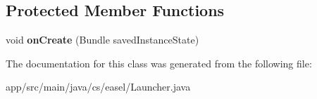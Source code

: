 \subsection*{Protected Member Functions}
\begin{DoxyCompactItemize}
\item 
\hypertarget{classcs_1_1easel_1_1_launcher_a2f03cb72c4c991de9d8530f4c359f625}{void {\bfseries on\+Create} (Bundle saved\+Instance\+State)}\label{classcs_1_1easel_1_1_launcher_a2f03cb72c4c991de9d8530f4c359f625}

\end{DoxyCompactItemize}


The documentation for this class was generated from the following file\+:\begin{DoxyCompactItemize}
\item 
app/src/main/java/cs/easel/Launcher.\+java\end{DoxyCompactItemize}
